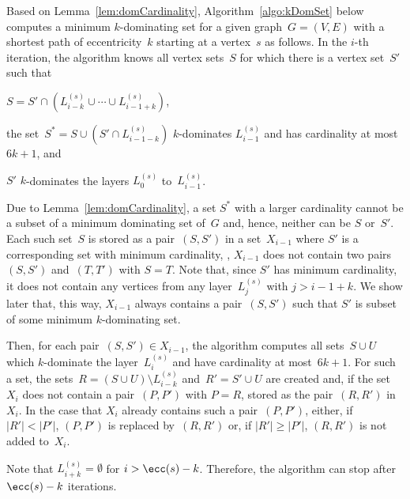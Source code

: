Based on Lemma~\ref{lem:domCardinality}, Algorithm~\ref{algo:kDomSet} below computes a minimum $k$-dominating set for a given graph~$G = (V, E)$ with a shortest path of eccentricity~$k$ starting at a vertex~$s$ as follows.
In the $i$-th iteration, the algorithm knows all vertex sets~$S$ for which there is a vertex set~$S'$ such that
\begin{enumerate*}[(i),mode=unboxed]
    \item
        $S = S' \cap \left ( L_{i-k}^{(s)} \cup \cdots \cup L_{i-1+k}^{(s)} \right )$,
    \item
        the set~$S^* = S \cup \left ( S' \cap L_{i-1-k}^{(s)} \right )$ $k$-dominates $L_{i-1}^{(s)}$ and has cardinality at most~$6k + 1$, and
    \item
        $S'$ $k$-dominates the layers $L_0^{(s)}$ to~$L_{i-1}^{(s)}$.
\end{enumerate*}
Due to Lemma~\ref{lem:domCardinality}, a set $S^*$ with a larger cardinality cannot be a subset of a minimum dominating set of~$G$ and, hence, neither can be $S$ or~$S'$.
Each such set~$S$ is stored as a pair~$(S, S')$ in a set~$X_{i-1}$ where $S'$ is a corresponding set with minimum cardinality, \ie, $X_{i-1}$ does not contain two pairs $(S, S')$ and~$(T, T')$ with $S = T$.
Note that, since $S'$ has minimum cardinality, it does not contain any vertices from any layer~$L_j^{(s)}$ with $j > i - 1 + k$.
We show later that, this way, $X_{i-1}$ always contains a pair~$(S, S')$ such that $S'$ is subset of some minimum $k$-dominating set.

Then, for each pair~$(S, S') \in X_{i-1}$, the algorithm computes all sets~$S \cup U$ which $k$-dominate the layer~$L_{i}^{(s)}$ and have cardinality at most~$6k + 1$.
For such a set, the sets~$R = (S \cup U) \setminus L_{i-k}^{(s)}$ and~$R' = S' \cup U$ are created and, if the set~$X_i$ does not contain a pair~$(P, P')$ with $P = R$, stored as the pair~$(R, R')$ in~$X_i$.
In the case that $X_i$ already contains such a pair~$(P, P')$, either, if $|R'| < |P'|$, $(P, P')$ is replaced by~$(R, R')$ or, if $|R'| \geq |P'|$, $(R, R')$ is not added to~$X_i$.

Note that $L_{i+k}^{(s)} = \emptyset$ for $i > \ecc(s) - k$.
Therefore, the algorithm can stop after $\ecc(s) - k$ iterations.

